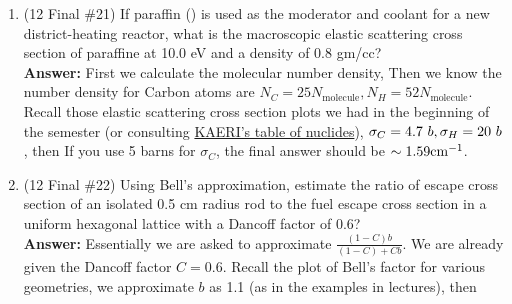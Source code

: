 \documentclass{school-22.211-notes}
\begin{document}
\clearpage
{}
\begin{enumerate}
\item (12 Final \#21) If paraffin () is used as the moderator and coolant for a new district-heating reactor, what is the macroscopic elastic scattering cross section of paraffine at 10.0 eV and a density of 0.8 gm/cc? \\
\textbf{Answer:} First we calculate the molecular number density, 
Then we know the number density for Carbon atoms are $N_C = 25 N_{\mathrm{molecule}}, N_H = 52 N_{\mathrm{molecule}}$. Recall those elastic scattering cross section plots we had in the beginning of the semester (or consulting \href{http://atom.kaeri.re.kr/}{KAERI's table of nuclides}), $\sigma_C = 4.7 \mbox{ } b, \sigma_H = 20 \mbox{ } b$, then
If you use 5 barns for $\sigma_C$, the final answer should be $\sim 1.59 \mathrm{cm}^{-1}$. 

\item (12 Final \#22) Using Bell's approximation, estimate the ratio of escape cross section of an isolated 0.5 cm radius rod to the fuel escape cross section in a uniform hexagonal lattice with a Dancoff factor of 0.6? \\
\textbf{Answer:} Essentially we are asked to approximate $\displaystyle \frac{(1-C)b}{(1-C) + Cb}$. We are already given the Dancoff factor $C = 0.6$. Recall the plot of Bell's factor for various geometries, we approximate $b$ as 1.1 (as in the examples in lectures), then 



\end{enumerate}




\end{document}
